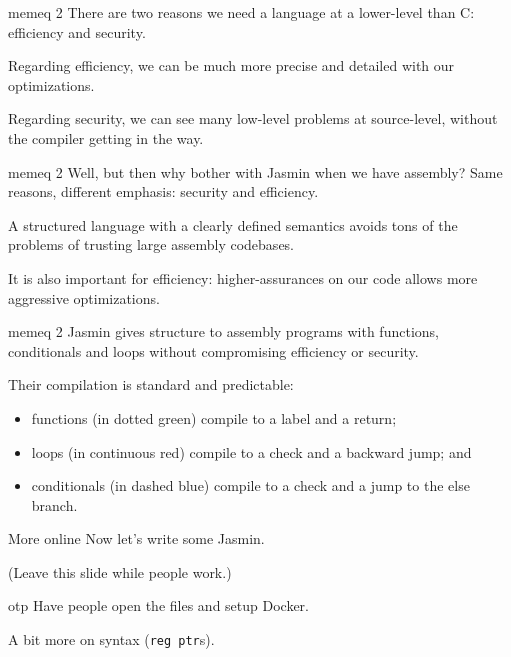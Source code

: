\documentclass[
  xcolor={table,dvipsnames},
]{beamer}
\newcommand{\nextframe}{{\color{Red}{[NEXT FRAME]}}}
\begin{document}
\begin{frame}{memeq 2}
  There are two reasons we need a language at a lower-level than C: efficiency
  and security.

  \vfill

  Regarding efficiency, we can be much more precise and detailed with our
  optimizations.

  \vfill

  Regarding security, we can see many low-level problems at source-level,
  without the compiler getting in the way.
\end{frame}


\begin{frame}{memeq 2}
  Well, but then why bother with Jasmin when we have assembly?
  Same reasons, different emphasis: security and efficiency.

  \vfill

  A structured language with a clearly defined semantics avoids tons of the
  problems of trusting large assembly codebases.

  \vfill

  It is also important for efficiency: higher-assurances on our code allows more
  aggressive optimizations.
\end{frame}

\begin{frame}{memeq 2}
  Jasmin gives structure to assembly programs with functions, conditionals and
  loops without compromising efficiency or security.

  \nextframe

  Their compilation is standard and predictable:
  \begin{itemize}
  \itemsep=1em
  \item[] functions (in dotted green) compile to a label and a return;
  \item[] loops (in continuous red) compile to a check and a backward jump; and
  \item[] conditionals (in dashed blue) compile to a check and a jump to the
  else branch.
  \end{itemize}
\end{frame}

\begin{frame}{More online}
  Now let's write some Jasmin.

  \nextframe

  (Leave this slide while people work.)
\end{frame}

\begin{frame}{otp}
  Have people open the files and setup Docker.

  \vfill

  A bit more on syntax (\texttt{reg ptr}s).
\end{frame}
\end{document}
